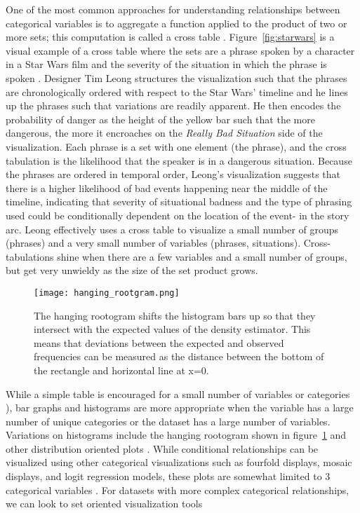 \documentclass[../main.tex]{subfiles}
\begin{document}
One of the most common approaches for understanding relationships between categorical variables is to aggregate a function applied to the product of two or more sets; this computation is called a cross table \cite{goodman_measures_1991}. Figure~\ref{fig:starwars} is a visual example of a cross table where the sets are a phrase spoken by a character in a Star Wars film and the severity of the situation in which the phrase is spoken \cite{leong_star_2017}. Designer Tim Leong structures the visualization such that the phrases are chronologically ordered with respect to the Star Wars' timeline and he lines up the phrases such that variations are readily apparent. He then encodes the probability of danger as the height of the yellow bar such that the more dangerous, the more it encroaches on the \textit{Really Bad Situation} side of the visualization. Each phrase is a set with one element (the phrase), and the cross tabulation is the likelihood that the speaker is in a dangerous situation. Because the phrases are ordered in temporal order, Leong's visualization suggests that there is a higher likelihood of bad events happening near the middle of the timeline, indicating that severity of situational badness and the type of phrasing used could be conditionally dependent on the location of the event- in the story arc. Leong effectively uses a cross table to visualize a small number of groups (phrases) and a very small number of variables (phrases, situations). Cross-tabulations shine when there are a few variables and a small number of groups, but get very unwieldy as the size of the set product grows. 

\begin{figure}[H]
\texttt{[image: hanging\_rootgram.png]}
\caption{The hanging rootogram shifts the histogram bars up so that they intersect with the expected values of the density estimator. This means that deviations between the expected and observed frequencies can be measured as the distance between the bottom of the rectangle and horizontal line at x=0.}
\label{fig:hanging_rootogram}
\end{figure}
 While a simple table is encouraged for a small number of variables or categories \cite{munzner_visualization_2014}), bar graphs and histograms \cite{ioannidis_history_2003-1, friendly_brief_2006} are more appropriate when the variable has a large number of unique categories or the dataset has a large number of variables. Variations on histograms  include the hanging rootogram shown in figure~\ref{fig:hanging_rootogram} and other distribution oriented plots \cite{tukey_exploratory_1977, friendly_visualizing_2000}. While conditional relationships can be visualized using other categorical visualizations such as fourfold displays, mosaic displays, and logit regression models, these plots are somewhat limited to 3 categorical variables \cite{friendly_visualizing_2000}. For datasets with more complex categorical relationships, we can look to set oriented visualization tools 
   
\end{document}
